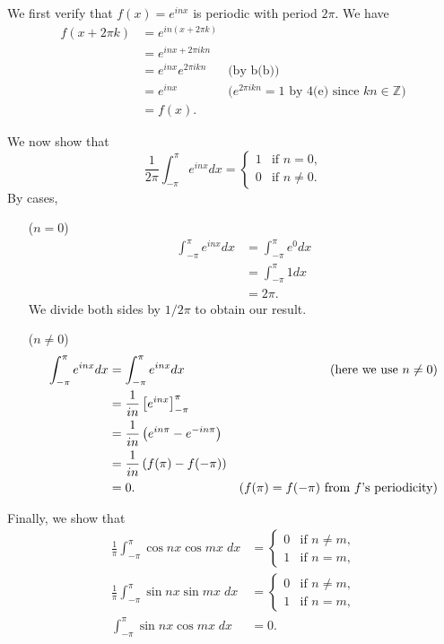 \documentclass[oneside]{article}
\newcommand\bbZ{\mathbb{Z}}
\begin{document}
  We first verify that $f(x) = e^{inx}$ is periodic with period $2\pi$. We have
  \begin{align*}
    f(x + 2\pi k) &= e^{in(x + 2\pi k)} \\
    &= e^{inx+2\pi i k n} \\
    &= e^{inx}e^{2\pi i k n} &\text{(by b(b))} \\
    &= e^{inx} &\text{($e^{2\pi i k n} = 1$ by 4(e) since $kn\in\bbZ$)} \\
    &= f(x)\text{.}
  \end{align*}

  We now show that \begin{equation}
    \label{eq:main-identity}
    \frac{1}{2\pi}\int_{-\pi}^\pi e^{inx} dx = \begin{cases}
      1 & \text{if }n = 0 \text{,} \\
      0 & \text{if }n \neq 0 \text{.}
    \end{cases}
  \end{equation} By cases,
  \begin{itemize}[leftmargin=37pt]
    \item[($n=0$)]
      \begin{align*}
        \int_{-\pi}^\pi e^{inx} dx
        &=\int_{-\pi}^\pi e^{0} dx \\
        &= \int_{-\pi}^\pi 1 dx \\
        &= 2\pi\text{.}
      \end{align*} We divide both sides by $1/2\pi$ to obtain our result.
    \item[($n\neq0$)] \begin{align*}
      \int_{-\pi}^\pi e^{inx} dx
      &= \int_{-\pi}^\pi e^{inx} dx &\text{(here we use $n\neq0$)} \\
      &= \frac{1}{in}\left[ e^{inx} \right]_{-\pi}^\pi \\
      &= \frac{1}{in}\left( e^{in\pi} - e^{-in\pi} \right) \\
      &= \frac{1}{in}\left( f(\pi) - f(-\pi) \right) \\
      &= 0\text. &\text{($f(\pi)=f(-\pi)$ from $f$'s periodicity)}
    \end{align*}
  \end{itemize}

  Finally, we show that \begin{align*}
    \frac{1}{\pi}\int_{-\pi}^{\pi} \cos nx \cos mx\;dx &= \begin{cases}
      0 & \text{if }n \neq m \text{,} \\
      1 & \text{if }n = m \text{,}
    \end{cases} \\
    \frac{1}{\pi}\int_{-\pi}^{\pi} \sin nx \sin mx\;dx &= \begin{cases}
      0 & \text{if }n \neq m \text{,} \\
      1 & \text{if }n = m \text{,}
    \end{cases} \\
    \int_{-\pi}^{\pi} \sin nx \cos mx\;dx &= 0\text{.}
  \end{align*}
\end{document}
